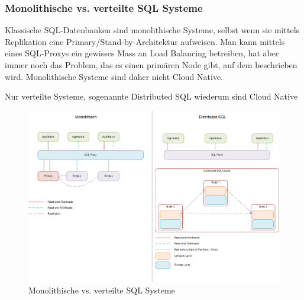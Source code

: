 
\subsubsection{Monolithische vs. verteilte SQL Systeme}
\begin{flushleft}
    Klassische SQL-Datenbanken sind monolithische Systeme, selbst wenn sie mittels Replikation eine Primary/Stand-by-Architektur aufweisen.
    Man kann mittels eines SQL-Proxys ein gewisses Mass an Load Balancing betreiben, hat aber immer noch das Problem, das es einen primären Node gibt, auf dem beschrieben wird.
    Monolithische Systeme sind daher nicht Cloud Native.
\end{flushleft}
\begin{flushleft}
    Nur verteilte Systeme, sogenannte Distributed SQL wiederum sind Cloud Native

    \begin{figure}[H]
        \centering
        \includegraphics[width=1\linewidth]{source/implementation/evaluation/excursus_architecture/monolith_distributed}
        \caption{Monolithische vs. verteilte SQL Systeme}
        \label{fig:Monolith_vs_Distributed_SQL}
    \end{figure}
\end{flushleft}
